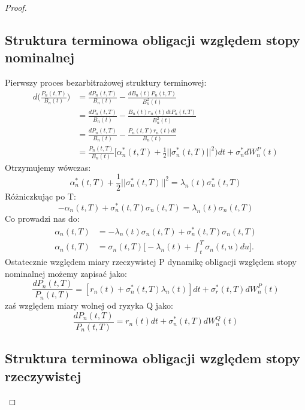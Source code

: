 \documentclass{mini}
\theoremstyle{mythstyle}
\begin{document}
\begin{proof}
	\subsection*{Struktura terminowa obligacji względem stopy nominalnej}
	Pierwszy proces bezarbitrażowej struktury terminowej:
	\begin{align*}
	d\bigg(\frac{P_n(t,T)}{B_n(t)}\bigg)  &= \frac{dP_n(t,T)}{B_n(t)} - \frac{dB_n(t)P_n(t,T)}{B_n^2(t)}\\
	&= \frac{dP_n(t,T)}{B_n(t)} - \frac{B_n(t)r_n(t)dt P_n(t,T)}{B_n^2(t)} \\
	&= \frac{dP_n(t,T)}{B_n(t)} - \frac{P_n(t,T) r_n(t)dt }{B_n(t)} \\
	&=\frac{P_n(t,T)}{B_n(t)} \bigg[  \alpha_n^*(t,T) + \frac{1}{2} ||\sigma_n^*(t,T)||^2)dt + \sigma_n^*dW_n^P(t)
	\end{align*}
	Otrzymujemy wówczas:
	\begin{equation}
	\alpha_n^*(t,T) + \frac{1}{2} ||\sigma_n^*(t,T)||^2 = \lambda_n(t)\sigma_n^*(t,T)
	\end{equation}
	Różniczkując po T:
	\begin{equation}
	-\alpha_n(t,T) + \sigma_n^*(t,T)\sigma_n(t,T) = \lambda_n(t)\sigma_n(t,T)
	\end{equation}
	Co prowadzi nas do:
	\begin{align*}
	\alpha_n(t,T) &= - \lambda_n(t)\sigma_n(t,T) + \sigma_n^*(t,T)\sigma_n(t,T) \\
	\alpha_n(t,T) &= \sigma_n(t,T)\bigg[ -\lambda_n(t) + \int_{t}^{T}\sigma_n(t,u) du\bigg].
	\end{align*}
	Ostatecznie względem miary rzeczywistej P dynamikę obligacji względem stopy nominalnej możemy zapisać jako:
	\begin{equation}
	\frac{dP_n(t,T)}{P_n(t,T)} = [r_n(t) +\sigma^*_n(t,T)\lambda_n(t)]dt + \sigma^*_r(t,T)dW^P_n(t)
	\end{equation}
	zaś względem miary wolnej od ryzyka Q jako:
	\begin{equation}
	\frac{dP_n(t,T)}{P_n(t,T)} = r_n(t)dt + \sigma^*_n(t,T)dW^Q_n(t)
	\end{equation}
	
	\subsection*{Struktura terminowa obligacji względem stopy rzeczywistej}
	

\end{proof}
\end{document}
